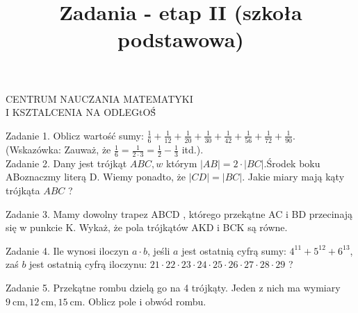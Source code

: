 \documentclass[10pt]{article}
\title{Zadania - etap II (szkoła podstawowa) }
\author{}
\date{}
\begin{document}
\maketitle
CENTRUM NAUCZANIA MATEMATYKI\\
I KSZTALCENIA NA ODLEGtOŚ́

Zadanie 1. Oblicz wartość sumy: \(\frac{1}{6}+\frac{1}{12}+\frac{1}{20}+\frac{1}{30}+\frac{1}{42}+\frac{1}{56}+\frac{1}{72}+\frac{1}{90}\).\\
(Wskazówka: Zauważ, że \(\frac{1}{6}=\frac{1}{2 \cdot 3}=\frac{1}{2}-\frac{1}{3}\) itd.).\\
Zadanie 2. Dany jest trójkąt \(A B C, w\) którym \(|A B|=2 \cdot|B C|\).Środek boku ABoznaczmy literą D. Wiemy ponadto, że \(|C D|=|B C|\). Jakie miary mają kąty trójkąta \(A B C\) ?

Zadanie 3. Mamy dowolny trapez ABCD , którego przekątne AC i BD przecinają się w punkcie K. Wykaż, że pola trójkątów AKD i BCK są równe.

Zadanie 4. Ile wynosi iloczyn \(a \cdot b\), jeśli \(a\) jest ostatnią cyfrą sumy: \(4^{11}+5^{12}+6^{13}\), zaś \(b\) jest ostatnią cyfrą iloczynu: \(21 \cdot 22 \cdot 23 \cdot 24 \cdot 25 \cdot 26 \cdot 27 \cdot 28 \cdot 29\) ?

Zadanie 5. Przekątne rombu dzielą go na 4 trójkąty. Jeden z nich ma wymiary \(9 \mathrm{~cm}, 12 \mathrm{~cm}, 15 \mathrm{~cm}\). Oblicz pole i obwód rombu.
\end{document}
